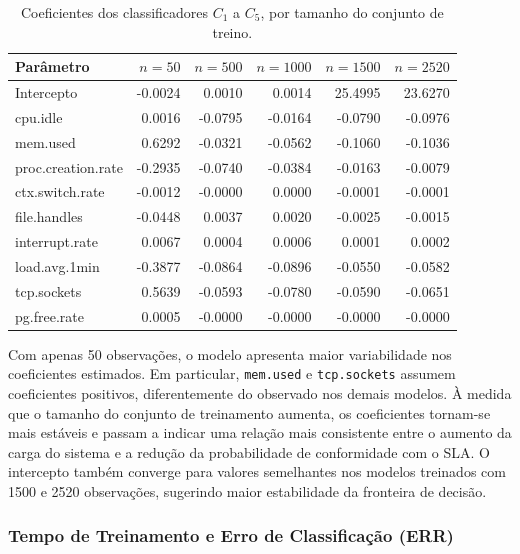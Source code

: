 \documentclass[11pt,a4paper]{article}
\begin{document}
\begin{table}[H]
\centering
\caption{Coeficientes dos classificadores $C_1$ a $C_5$, por tamanho do conjunto de treino.}
\label{tab:coefs_clf}
\small
\begin{tabular}{lrrrrr}
\toprule
\textbf{Parâmetro} & \textbf{$n=50$} & \textbf{$n=500$} & \textbf{$n=1000$} & \textbf{$n=1500$} & \textbf{$n=2520$} \\
\midrule
Intercepto              & -0.0024 &  0.0010 &  0.0014 & 25.4995 & 23.6270 \\
cpu.idle                &  0.0016 & -0.0795 & -0.0164 & -0.0790 & -0.0976 \\
mem.used                &  0.6292 & -0.0321 & -0.0562 & -0.1060 & -0.1036 \\
proc.creation.rate      & -0.2935 & -0.0740 & -0.0384 & -0.0163 & -0.0079 \\
ctx.switch.rate         & -0.0012 & -0.0000 &  0.0000 & -0.0001 & -0.0001 \\
file.handles            & -0.0448 &  0.0037 &  0.0020 & -0.0025 & -0.0015 \\
interrupt.rate          &  0.0067 &  0.0004 &  0.0006 &  0.0001 &  0.0002 \\
load.avg.1min           & -0.3877 & -0.0864 & -0.0896 & -0.0550 & -0.0582 \\
tcp.sockets             &  0.5639 & -0.0593 & -0.0780 & -0.0590 & -0.0651 \\
pg.free.rate            &  0.0005 & -0.0000 & -0.0000 & -0.0000 & -0.0000 \\
\bottomrule
\end{tabular}
\end{table}

Com apenas 50 observações, o modelo apresenta maior variabilidade nos coeficientes estimados. Em particular, \texttt{mem.used} e \texttt{tcp.sockets} assumem coeficientes positivos, diferentemente do observado nos demais modelos. À medida que o tamanho do conjunto de treinamento aumenta, os coeficientes tornam-se mais estáveis e passam a indicar uma relação mais consistente entre o aumento da carga do sistema e a redução da probabilidade de conformidade com o SLA. O intercepto também converge para valores semelhantes nos modelos treinados com 1500 e 2520 observações, sugerindo maior estabilidade da fronteira de decisão.

\subsubsection{Tempo de Treinamento e Erro de Classificação (ERR)}
\end{document}
